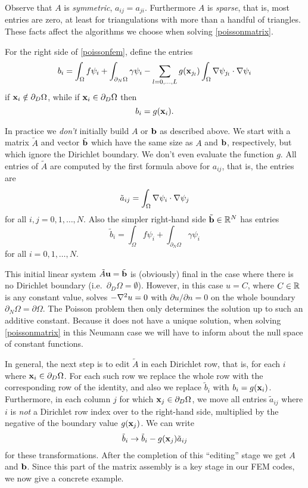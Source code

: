 Observe that $A$ is \emph{symmetric}, $a_{ij}=a_{ji}$.  Furthermore $A$ is \emph{sparse}, that is, most entries are zero, at least for triangulations with more than a handful of triangles.  These facts affect the algorithms we choose when solving \eqref{poissonmatrix}.

For the right side of \eqref{poissonfem}, define the entries
\begin{equation}
    b_i = \int_\Omega f \psi_i + \int_{\partial_N\Omega} \gamma \psi_i - \sum_{l=0,\dots,L} g(\mathbf{x}_{j_l})  \int_\Omega \nabla \psi_{j_l} \cdot \nabla \psi_i  \label{bentryfem}
\end{equation}
if $\mathbf{x}_i \notin \partial_D \Omega$, while if $\mathbf{x}_i \in \partial_D \Omega$ then
    $$b_i = g(\mathbf{x}_{i}).$$

In practice we \emph{don't} initially build $A$ or $\mathbf{b}$ as described above.  We start with a matrix $\tilde A$ and vector $\tilde {\mathbf{b}}$ which have the same size as $A$ and $\mathbf{b}$, respectively, but which ignore the Dirichlet boundary.  We don't even evaluate the function $g$.  All entries of $\tilde A$ are computed by the first formula above for $a_{ij}$, that is, the entries are
\begin{equation*}
\tilde a_{ij} = \int_\Omega \nabla \psi_i \cdot \nabla \psi_j
\end{equation*}
for all $i,j=0,1,\dots,N$.  Also the simpler right-hand side $\tilde {\mathbf{b}}\in\mathbb{R}^N$ has entries
    $$\tilde b_i = \int_\Omega f \psi_i + \int_{\partial_N\Omega} \gamma \psi_i$$
for all $i=0,1,\dots,N$.

This initial linear system $\tilde A\mathbf{u}=\tilde {\mathbf{b}}$ is (obviously) final in the case where there is no Dirichlet boundary (i.e.~$\partial_D \Omega=\emptyset$).  However, in this case $u=C$, where $C\in\mathbb{R}$ is any constant value, solves $-\nabla^2 u=0$ with $\partial u/\partial n = 0$ on the whole boundary $\partial_N \Omega = \partial \Omega$.  The Poisson problem then only determines the solution up to such an additive constant.  Because it does not have a unique solution, when solving \eqref{poissonmatrix} in this Neumann case we will have to inform \PETSc about the null space of constant functions.

In general, the next step is to edit $\tilde A$ in each Dirichlet row, that is, for each $i$ where $\mathbf{x}_i \in \partial_D \Omega$.  For each such row we replace the whole row with the corresponding row of the identity, and also we replace $\tilde b_i$ with $b_i = g(\mathbf{x}_i)$.  Furthermore, in each column $j$ for which $\mathbf{x}_j \in \partial_D \Omega$, we move all entries $\tilde a_{ij}$ where $i$ is \emph{not} a Dirichlet row index over to the right-hand side, multiplied by the negative of the boundary value $g(\mathbf{x}_{j})$.  We can write
\begin{equation}
    \tilde b_i \to \tilde b_i - g(\mathbf{x}_{j}) \tilde a_{ij} \label{btransform}
\end{equation}
for these transformations.  After the completion of this ``editing'' stage we get $A$ and $\mathbf{b}$.  Since this part of the matrix assembly is a key stage in our FEM codes, we now give a concrete example.

